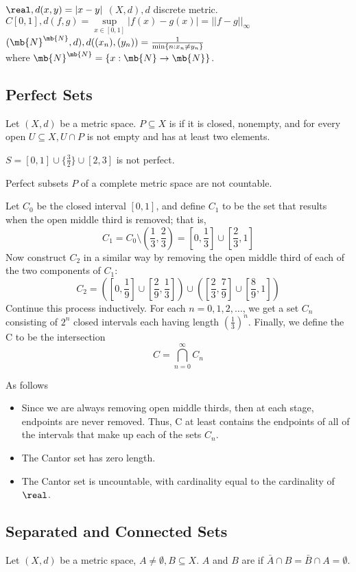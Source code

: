 \documentclass[11pt]{article}
\begin{document}
\example
$\real, d(x,y) = |x - y|$
\example
$(X, d), d$ discrete metric.
\example 
$C[0,1], d(f,g) = \underset{x \in [0, 1]}{\sup} |f(x) - g(x)| = ||f - g||_{\infty}$
\example
$(\mb{N}^{\mb{N}}, d), d((x_n), (y_n)) = \frac{1}{\min\{n: x_n \neq y_n\}}$
\\
where $\mb{N}^{\mb{N}} = \{x: \mb{N} \rightarrow \mb{N}\}$.


\subsection{Perfect Sets}
Let $(X,d)$ be a metric space. $P \subseteq X$ is  if it is closed, nonempty, and for every open $U \subseteq X, U \cap P$ is not empty and has at least two elements.

\example
$S = [0,1] \cup \{\frac{3}{2}\} \cup [2,3]$ is not perfect.

\property Perfect subsets $P$ of a complete metric space are not countable.

 Let $C_0$ be the closed interval $[0,1]$, and define $C_1$ to be the set that results when the open middle third is removed; that is,
$$C_1 = C_0 \setminus (\frac{1}{3}, \frac{2}{3}) = [0, \frac{1}{3}] \cup [\frac{2}{3}, 1]$$
Now construct $C_2$ in a similar way by removing the open middle third of each of the two components of $C_1$:
$$C_2 = ([0, \frac{1}{9}] \cup [\frac{2}{9}, \frac{1}{3}]) \cup ([\frac{2}{3}, \frac{7}{9}] \cup [\frac{8}{9}, 1])$$
Continue this process inductively. For each $n = 0,1,2,\hdots$, we get a set $C_n$ consisting of $2^n$ closed intervals each having length $(\frac{1}{3})^n$. Finally, we define the  C to be the intersection
$$C = \bigcap_{n=0}^\infty C_n$$

\remark As follows
\begin{itemize}
	\item Since we are always removing open middle thirds, then at each stage, endpoints are never removed. Thus, C at least contains the endpoints of all of the intervals that make up each of the sets $C_n$.
	\item The Cantor set has zero length.
	\item The Cantor set is uncountable, with cardinality equal to the cardinality of $\real$.
\end{itemize}

\subsection{Separated and Connected Sets}
Let $(X,d)$ be a metric space, $A \neq \emptyset, B \subseteq X$. $A$ and $B$ are  if $\bar{A} \cap B = \bar{B} \cap A = \emptyset$.
\end{document}
